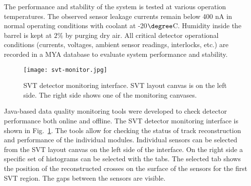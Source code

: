 The performance and stability of the system is tested at various operation temperatures. The observed sensor leakage currents remain below 400 nA in normal operating conditions with coolant at -20$\degree$C. Humidity inside the barrel is kept at $2\%$ by purging dry air. All critical detector operational conditions (currents, voltages, ambient sensor readings, interlocks, etc.) are recorded in a MYA database \cite{MYA} to evaluate system performance and stability. 

\begin{figure}[hbt] 
\centering 
\texttt{[image: svt-monitor.jpg]}
\caption{SVT detector monitoring interface. SVT layout canvas is on the left side. The right side shows one of the monitoring canvases.}
\label{fig:svt-monitor}
\end{figure}

Java-based data quality monitoring tools were developed to check detector performance both online and offline. The SVT detector monitoring interface is shown in Fig.~\ref{fig:svt-monitor}. The tools allow for checking the status of track reconstruction and performance of the individual modules. Individual sensors can be selected from the SVT layout canvas on the left side of the interface. On the right side a specific set of histograms can be selected with the tabs. The selected tab shows the position of the reconstructed crosses on the surface of the sensors for the first SVT region. The gaps between the sensors are visible.

